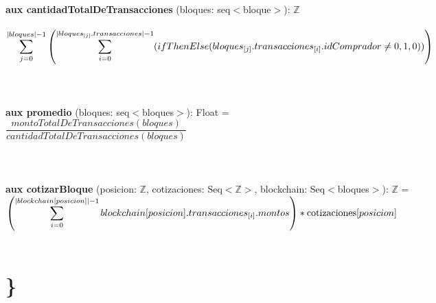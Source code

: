 \documentclass{article}
\newcommand{\Entero}{$\mathds{Z}$}
\begin{document}
        {\selectfont\textbf{aux cantidadTotalDeTransacciones} (bloques: seq$<$bloque$>$): \Entero}\\\\
    \indent\indent$\mathlarger\sum\limits_{j=0}^{|bloques|-1} \left(\mathlarger\sum\limits_{i=0}^{|bloques_{[j]}.transacciones|-1} (ifThenElse(bloques_{[j]}.transacciones_{[i]}.idComprador \ne 0, 1, 0))\right)\indent\indent\indent$\\\\\\\\

    {\selectfont\textbf{aux promedio} (bloques: seq$<$bloques$>$): Float} = \\

    \indent\indent$\dfrac{montoTotalDeTransacciones(bloques)}{cantidadTotalDeTransacciones(bloques)}$\\\\\\\\

    {\selectfont\textbf{aux cotizarBloque} (posicion: \Entero, cotizaciones: Seq$<$\Entero$>$, blockchain: Seq$<$bloques$>$): \Entero} =\\

        \indent\indent $\left( \mathlarger{\sum\limits_{i=0}^{|blockchain[posicion]|-1} blockchain[posicion].transacciones_{[i]}.montos} \right) * \text{cotizaciones}[posicion]$\\\\

\section*{\}}
\end{document}
